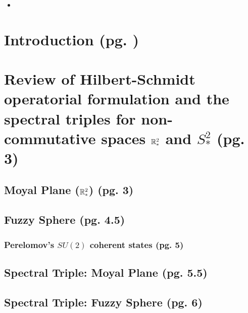 \documentclass{article}
\begin{document}
    \begin{itemize}

    \item 
    
    \end{itemize}

\section{Introduction (pg. )}

\section{Review of Hilbert-Schmidt operatorial formulation and the spectral triples for non-commutative spaces $\mathbb{R}^2_*$ and $S^2_*$ (pg. 3)}

\subsection{Moyal Plane ($\mathbb{R}^2_*$) (pg. 3)}

\subsection{Fuzzy Sphere (pg. 4.5)}

\subsubsection{Perelomov's $SU(2)$ coherent states (pg. 5)}%

\subsection{Spectral Triple: Moyal Plane (pg. 5.5)}

\subsection{Spectral Triple: Fuzzy Sphere (pg. 6)}
\end{document}
